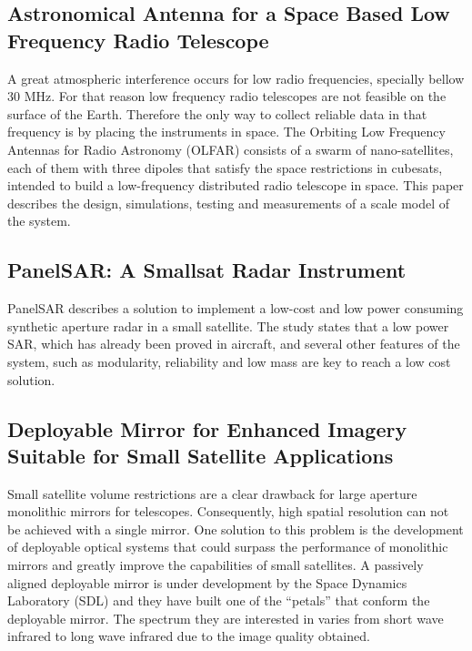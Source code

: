 \subsection{Astronomical Antenna for a Space Based Low Frequency Radio Telescope}
\label{astro_ant}
A great atmospheric interference occurs for low radio frequencies,
specially bellow 30 MHz. For that reason low frequency radio telescopes
are not feasible on the surface of the Earth. Therefore the only way
to collect reliable data in that frequency is by placing the instruments
in space. The Orbiting Low Frequency Antennas for Radio Astronomy
(OLFAR) consists of a swarm of nano-satellites, each of them with
three dipoles that satisfy the space restrictions in cubesats, intended
to build a low-frequency distributed radio telescope in space. This
paper describes the design, simulations, testing and measurements
of a scale model of the system. \cite{Quillen_FF_RadioTelescope}

\subsection{PanelSAR: A Smallsat Radar Instrument}
\label{panelsar}
PanelSAR describes a solution to implement a low-cost and low power consuming synthetic aperture radar in a small satellite. The study states that a low power SAR, which has already been proved in aircraft, and several other features of the system, such as modularity, reliability and low mass are key to reach a low cost solution.\cite{Dujin_Radar}

\subsection{Deployable Mirror for Enhanced Imagery Suitable for Small Satellite Applications}
\label{deploy_mirror}

Small satellite volume restrictions are a clear drawback for large
aperture monolithic mirrors for telescopes. Consequently, high spatial
resolution can not be achieved with a single mirror. One solution
to this problem is the development of deployable optical systems that
could surpass the performance of monolithic mirrors and greatly improve
the capabilities of small satellites. A passively aligned deployable
mirror is under development by the Space Dynamics Laboratory (SDL) and
they have built one of the ``petals'' that conform the deployable
mirror. The spectrum they are interested in varies from short wave
infrared to long wave infrared due to the image quality obtained.\cite{Champagne_deployablemirror}

